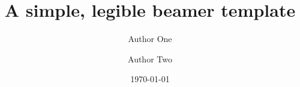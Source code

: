 




\title[Beamer template]{A simple, legible beamer template}

\author{Author One \and Author Two}


\date{\today} 
















